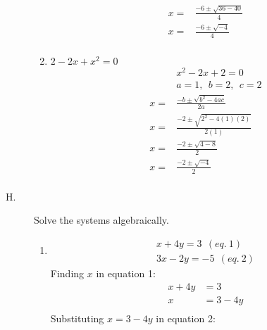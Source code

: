 \documentclass{article}
\begin{document}
\begin{description}
\begin{enumerate}
\begin{equation}
\begin{split}
                          x = & \frac{-6\pm \sqrt{36 - 40}}{4}\\
                          x = & \frac{-6\pm \sqrt{-4}}{4}\\
                      \end{split}
                  \end{equation}
            \item $2 - 2x + x^2 = 0$
                  \begin{equation}
                      \begin{split}
                          &x^2 - 2x + 2 = 0\\
                          &a = 1, \ \ b = 2, \ \ c = 2 \\
                          x = & \frac{-b\pm \sqrt{b^2 - 4ac}}{2a}\\
                          x = & \frac{-2\pm \sqrt{2^2 - 4(1)(2)}}{2(1)}\\
                          x = & \frac{-2\pm \sqrt{4 - 8}}{2}\\
                          x = & \frac{-2\pm \sqrt{-4}}{2}\\
                      \end{split}
                  \end{equation}
        \end{enumerate}
    \item[H. ] Solve the systems algebraically.
        \begin{enumerate}
            \item
                  \begin{gather*}
                      x+4y = 3 \ \ (eq. \ 1)\\
                      3x-2y=-5 \ \ (eq. \ 2)
                  \end{gather*}
                  Finding $x$ in equation 1:
                  \begin{equation}
                      \begin{split}
                          x + 4y & = 3 \\
                          x      & = 3 - 4y \\
                      \end{split}
                  \end{equation}
                  Substituting $x = 3 - 4y$ in equation 2:
                  \begin{equation}
                      \begin{split}

\end{split}
\end{equation}
\end{enumerate}
\end{description}
\end{document}

